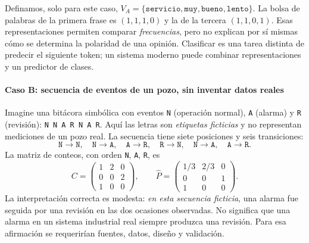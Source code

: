 \begin{center}
\end{center}
Definamos, solo para este caso, $V_A=\{\texttt{servicio},\texttt{muy},\texttt{bueno},\texttt{lento}\}$. La bolsa de palabras de la primera frase es $(1,1,1,0)$ y la de la tercera $(1,1,0,1)$. Esas representaciones permiten comparar \emph{frecuencias}, pero no explican por sí mismas cómo se determina la polaridad de una opinión. Clasificar es una tarea distinta de predecir el siguiente token; un sistema moderno puede combinar representaciones y un predictor de clases.

\paragraph{Caso B: secuencia de eventos de un pozo, sin inventar datos reales}
Imagine una bitácora simbólica con eventos \texttt{N} (operación normal), \texttt{A} (alarma) y \texttt{R} (revisión): \texttt{N N A R N A R}. Aquí las letras son \emph{etiquetas ficticias} y no representan mediciones de un pozo real. La secuencia tiene siete posiciones y seis transiciones:
\[
\texttt{N}\to\texttt{N},\quad \texttt{N}\to\texttt{A},\quad \texttt{A}\to\texttt{R},\quad \texttt{R}\to\texttt{N},\quad \texttt{N}\to\texttt{A},\quad \texttt{A}\to\texttt{R}.
\]
La matriz de conteos, con orden \texttt{N}, \texttt{A}, \texttt{R}, es
\[
C=\begin{pmatrix}1&2&0\\0&0&2\\1&0&0\end{pmatrix},\qquad
\widehat P=\begin{pmatrix}1/3&2/3&0\\0&0&1\\1&0&0\end{pmatrix}.
\]
La interpretación correcta es modesta: \emph{en esta secuencia ficticia}, una alarma fue seguida por una revisión en las dos ocasiones observadas. No significa que una alarma en un sistema industrial real siempre produzca una revisión. Para esa afirmación se requerirían fuentes, datos, diseño y validación.

